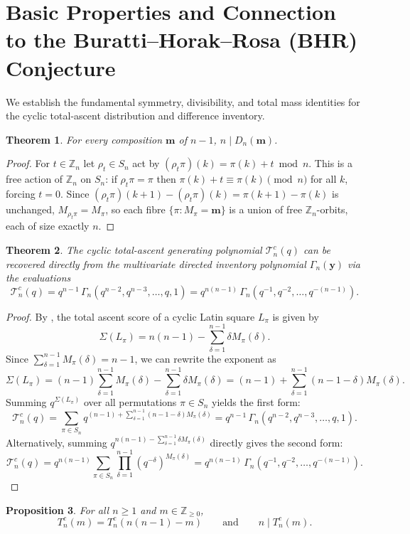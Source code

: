 \documentclass[11pt,a4paper]{amsart}
\newtheorem{theorem}{Theorem}[section]
\newtheorem{proposition}[theorem]{Proposition}
\newcommand{\Z}{\mathbb{Z}}
\newcommand{\1}{\mathbf{1}}
\begin{document}
\section{Basic Properties and Connection to the Buratti--Horak--Rosa (BHR) Conjecture}\label{sec:cyclic-basic-properties}
We establish the fundamental symmetry, divisibility, and total mass identities for the cyclic total-ascent distribution and difference inventory.
\begin{theorem}\label{thm:cyclic-div}
For every composition $\mathbf m$ of $n-1$, $n\mid D_n(\mathbf m)$.
\end{theorem}
\begin{proof}
For $t\in\Z_n$ let $\rho_t\in S_n$ act by $(\rho_t\pi)(k)=\pi(k)+t\bmod n$. This is a free action of $\Z_n$ on $S_n$: if $\rho_t\pi=\pi$ then $\pi(k)+t\equiv\pi(k)\pmod n$ for all $k$, forcing $t=0$. Since $(\rho_t\pi)(k{+}1)-(\rho_t\pi)(k)=\pi(k{+}1)-\pi(k)$ is unchanged, $M_{\rho_t\pi}=M_\pi$, so each fibre $\{\pi:M_\pi=\mathbf m\}$ is a union of free $\Z_n$-orbits, each of size exactly $n$.
\end{proof}
\begin{theorem}
\label{thm:cyclic-ascent-inventory}
The cyclic total-ascent generating polynomial $\mathcal{T}_n^c(q)$ can be recovered directly from the multivariate directed inventory polynomial $\Gamma_n(\bm{y})$ via the evaluations
\begin{equation}
\mathcal{T}_n^c(q) 
= q^{n-1} \, \Gamma_n\left(q^{n-2}, q^{n-3}, \dots, q, 1\right) 
= q^{n(n-1)} \, \Gamma_n\left(q^{-1}, q^{-2}, \dots, q^{-(n-1)}\right).
\end{equation}
\end{theorem}

\begin{proof}
By \cite[Proposition~4.5]{LEN}, the total ascent score of a cyclic Latin square $L_\pi$ is given by
\[
\Sigma(L_\pi) = n(n-1) - \sum_{\delta=1}^{n-1} \delta M_\pi(\delta).
\]
Since $\sum_{\delta=1}^{n-1} M_\pi(\delta) = n-1$, we can rewrite the exponent as
\[
\Sigma(L_\pi) 
= (n-1)\sum_{\delta=1}^{n-1} M_\pi(\delta) - \sum_{\delta=1}^{n-1} \delta M_\pi(\delta) 
= (n-1) + \sum_{\delta=1}^{n-1} (n - 1 - \delta) M_\pi(\delta).
\]
Summing $q^{\Sigma(L_\pi)}$ over all permutations $\pi \in S_n$ yields the first form:
\[
\mathcal{T}_n^c(q) = \sum_{\pi \in S_n} q^{(n-1) + \sum_{\delta=1}^{n-1} (n - 1 - \delta) M_\pi(\delta)} = q^{n-1} \, \Gamma_n\left(q^{n-2}, q^{n-3}, \dots, q, 1\right).
\]
Alternatively, summing $q^{n(n-1) - \sum_{\delta=1}^{n-1} \delta M_\pi(\delta)}$ directly gives the second form:
\[
\mathcal{T}_n^c(q) = q^{n(n-1)} \sum_{\pi \in S_n} \prod_{\delta=1}^{n-1} \left(q^{-\delta}\right)^{M_\pi(\delta)} = q^{n(n-1)} \, \Gamma_n\left(q^{-1}, q^{-2}, \dots, q^{-(n-1)}\right).
\]
\end{proof}
\begin{proposition}
\label{prop:cyclic-symmetry-divisibility}
For all $n \ge 1$ and $m \in \mathbb{Z}_{\ge 0}$,
\begin{equation}
T_n^c(m) = T_n^c\left(n(n-1) - m\right) \qquad \text{and} \qquad n \mid T_n^c(m).
\end{equation}
\end{proposition}
\end{document}
